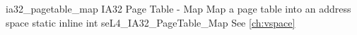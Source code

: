 %
%
%
%

\apidoc
{ia32_pagetable_map}
{IA32 Page Table - Map}
{Map a page table into an address space}
{static inline int seL4\_IA32\_PageTable\_Map}
{
}
{\errorenumdesc}
{See \autoref{ch:vspace}}
